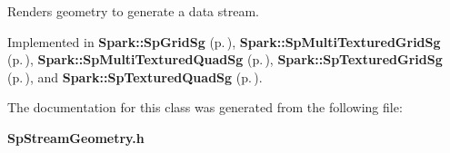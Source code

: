 Renders geometry to generate a data stream. 



Implemented in {\bf Spark::Sp\-Grid\-Sg} {\rm (p.\,\pageref{classSpark_1_1SpGridSg_a2})}, {\bf Spark::Sp\-Multi\-Textured\-Grid\-Sg} {\rm (p.\,\pageref{classSpark_1_1SpMultiTexturedGridSg_a2})}, {\bf Spark::Sp\-Multi\-Textured\-Quad\-Sg} {\rm (p.\,\pageref{classSpark_1_1SpMultiTexturedQuadSg_a2})}, {\bf Spark::Sp\-Textured\-Grid\-Sg} {\rm (p.\,\pageref{classSpark_1_1SpTexturedGridSg_a2})}, and {\bf Spark::Sp\-Textured\-Quad\-Sg} {\rm (p.\,\pageref{classSpark_1_1SpTexturedQuadSg_a2})}.



The documentation for this class was generated from the following file:\begin{CompactItemize}
\item 
{\bf Sp\-Stream\-Geometry.h}\end{CompactItemize}
